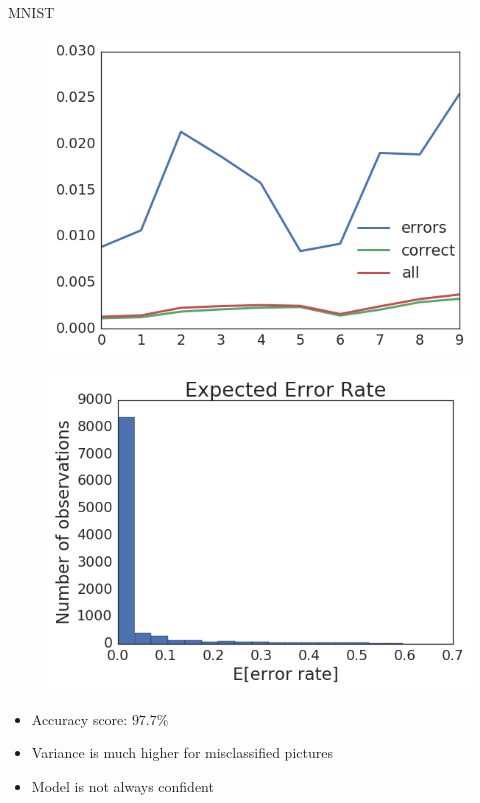 \documentclass{beamer}
\begin{document}
\begin{frame}{MNIST}
	\begin{minipage}[t]{0.45\columnwidth}
		\begin{figure}
			\includegraphics[width=1\columnwidth]{pres_pics/mnist_variance}
		\end{figure}
	\end{minipage}
	\hfill
	\begin{minipage}[t]{0.49\columnwidth}
		\begin{figure}
			\includegraphics[width=1\columnwidth]{pres_pics/mnist_eer}
		\end{figure}
	\end{minipage}
	\begin{itemize}
		\item Accuracy score: $97.7 \%$
		\item Variance is much higher for misclassified pictures
		\item Model is not always confident
	\end{itemize}
\end{frame}
\end{document}
